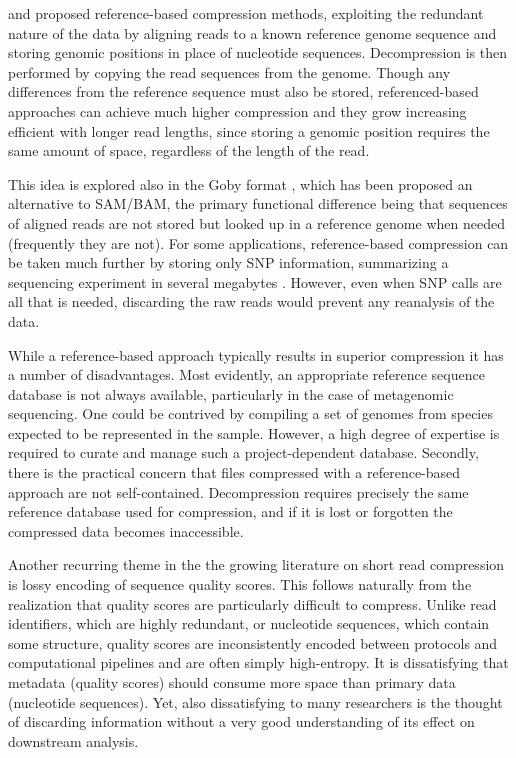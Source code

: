 \documentclass[a4,center,fleqn]{NAR}
\begin{document}
\citet{Kozanitis2011} and \citet{Hsi-YangFritz2011} proposed reference-based
compression methods, exploiting the redundant nature of the data by aligning
reads to a known reference genome sequence and storing genomic positions in
place of nucleotide sequences. Decompression is then performed by copying the
read sequences from the genome. Though any differences from the reference
sequence must also be stored, referenced-based approaches can achieve much
higher compression and they grow increasing efficient with longer read
lengths, since storing a genomic position requires the same amount of space,
regardless of the length of the read.

This idea is explored also in the Goby format \citep{Goby2012}, which has been
proposed an alternative to SAM/BAM, the primary functional difference being
that sequences of aligned reads are not stored but looked up in a reference
genome when needed (frequently they are not). For some applications,
reference-based compression can be taken much further by storing only SNP
information, summarizing a sequencing experiment in several megabytes
\citep{Christley2009}. However, even when SNP calls are all that is needed,
discarding the raw reads would prevent any reanalysis of the data.

While a reference-based approach typically results in superior compression it
has a number of disadvantages. Most evidently, an appropriate reference
sequence database is not always available, particularly in the case of metagenomic
sequencing. One could be contrived by compiling a set of genomes from species
expected to be represented in the sample. However, a high degree of expertise
is required to curate and manage such a project-dependent database. Secondly,
there is the practical concern that files compressed with a reference-based
approach are not self-contained. Decompression requires precisely the same
reference database used for compression, and if it is lost or forgotten the
compressed data becomes inaccessible.



Another recurring theme in the the growing literature on short read
compression is lossy encoding of sequence quality scores. This follows
naturally from the realization that quality scores are particularly difficult
to compress. Unlike read identifiers, which are highly redundant, or
nucleotide sequences, which contain some structure, quality scores are
inconsistently encoded between protocols and computational pipelines and are
often simply high-entropy. It is dissatisfying that metadata (quality scores)
should consume more space than primary data (nucleotide sequences). Yet, also
dissatisfying to many researchers is the thought of discarding information
without a very good understanding of its effect on downstream analysis.
\end{document}
